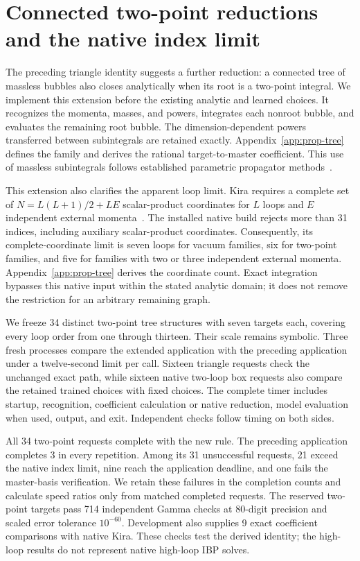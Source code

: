 \section{Connected two-point reductions and the native index limit}
\label{sec:prop-tree}
The preceding triangle identity suggests a further reduction: a connected tree of massless bubbles also closes analytically when its root is a two-point integral. We implement this extension before the existing analytic and learned choices. It recognizes the momenta, masses, and powers, integrates each nonroot bubble, and evaluates the remaining root bubble. The dimension-dependent powers transferred between subintegrals are retained exactly. Appendix~\ref{app:prop-tree} defines the family and derives the rational target-to-master coefficient. This use of massless subintegrals follows established parametric propagator methods~\cite{Ruijl2017Forcer}.

This extension also clarifies the apparent loop limit. Kira requires a complete set of $N=L(L+1)/2+LE$ scalar-product coordinates for $L$ loops and $E$ independent external momenta~\cite{Kira3}. The installed native build rejects more than 31 indices, including auxiliary scalar-product coordinates. Consequently, its complete-coordinate limit is seven loops for vacuum families, six for two-point families, and five for families with two or three independent external momenta. Appendix~\ref{app:prop-tree} derives the coordinate count. Exact integration bypasses this native input within the stated analytic domain; it does not remove the restriction for an arbitrary remaining graph.

We freeze 34 distinct two-point tree structures with seven targets each, covering every loop order from one through thirteen. Their scale remains symbolic. Three fresh processes compare the extended application with the preceding application under a twelve-second limit per call. Sixteen triangle requests check the unchanged exact path, while sixteen native two-loop box requests also compare the retained trained choices with fixed choices. The complete timer includes startup, recognition, coefficient calculation or native reduction, model evaluation when used, output, and exit. Independent checks follow timing on both sides.

All 34 two-point requests complete with the new rule. The preceding application completes 3 in every repetition. Among its 31 unsuccessful requests, 21 exceed the native index limit, nine reach the application deadline, and one fails the master-basis verification. We retain these failures in the completion counts and calculate speed ratios only from matched completed requests. The reserved two-point targets pass 714 independent Gamma checks at 80-digit precision and scaled error tolerance $10^{-60}$. Development also supplies 9 exact coefficient comparisons with native Kira. These checks test the derived identity; the high-loop results do not represent native high-loop IBP solves.

